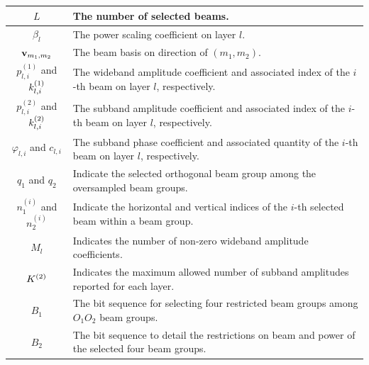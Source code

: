 \documentclass[lettersize,journal]{IEEEtran}
\begin{document}
\begin{table}[t]
\begin{center}
\begin{tabular}{|c|m{6cm}|}
\hline   ${L}$ & The number of selected beams.\\
\hline   $\beta _l$ & The power scaling coefficient on layer \(l\).\\
\hline   ${\bf{v}}_{{m_1},m_2}$ & The beam basis on direction of $({m_1},m_2).$ \\
\hline   $p_{l,i}^{(1)}$ and $k_{l,i}^{{\rm{(1)}}}$ & The wideband amplitude coefficient and associated index of the $i$-th beam on layer \(l\), respectively.\\
\hline   $p_{l,i}^{(2)}$ and $k_{l,i}^{{\rm{(2)}}}$& The subband amplitude coefficient and associated index of the $i$-th beam on layer \(l\), respectively.\\
\hline   ${\varphi _{l,i}}$ and ${c_{l,i}}$ & The subband phase coefficient and associated quantity of the $i$-th beam on layer \(l\), respectively.\\
\hline   ${q_1}$ and ${q_2}$ &  Indicate the selected orthogonal beam group among the oversampled beam groups.\\
\hline   $n_1^{(i)}$ and $n_2^{(i)}$ & Indicate the horizontal and vertical indices of the $i$-th selected beam within a beam group.\\
\hline    ${M_l}$& Indicates the number of non-zero wideband amplitude coefficients. \\
\hline    ${K^{{\rm{(2)}}}}$ & Indicates the maximum allowed number of subband amplitudes reported for each layer. \\
\hline    $B_1$ & The bit sequence for selecting four restricted beam groups among $O_1O_2$ beam groups.\\
\hline    $B_2$ & The bit sequence to detail the restrictions on beam and power of the selected four beam groups.\\
\hline   
\end{tabular}   
\end{center}   
\vspace{-12pt}
\end{table}
\end{document}
